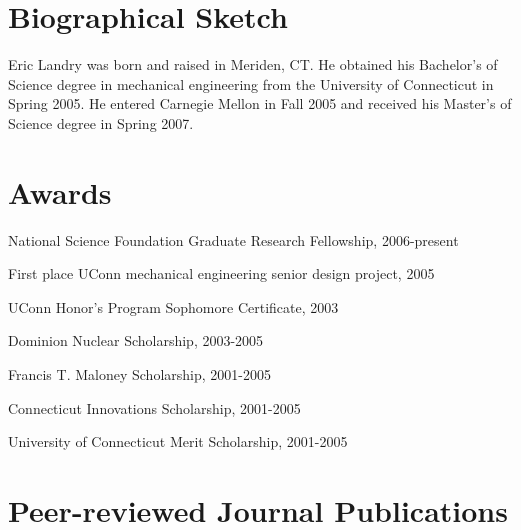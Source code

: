 \documentclass[letterpaper,12pt]{article}
\begin{document}
\clearpage

\section{Biographical Sketch} Eric Landry was born and
raised in Meriden, CT.  He obtained his Bachelor's of Science degree
in mechanical engineering from the University of Connecticut in
Spring 2005. He entered Carnegie Mellon in Fall 2005 and received
his Master's of Science degree in Spring 2007.

\section*{\label{S-awards}Awards}

National Science Foundation Graduate Research Fellowship,
2006-present

First place UConn mechanical engineering senior design project, 2005

UConn Honor's Program Sophomore Certificate, 2003

Dominion Nuclear Scholarship, 2003-2005

Francis T. Maloney Scholarship, 2001-2005

Connecticut Innovations Scholarship, 2001-2005

University of Connecticut Merit Scholarship, 2001-2005

\section*{Peer-reviewed Journal Publications}
\end{document}
